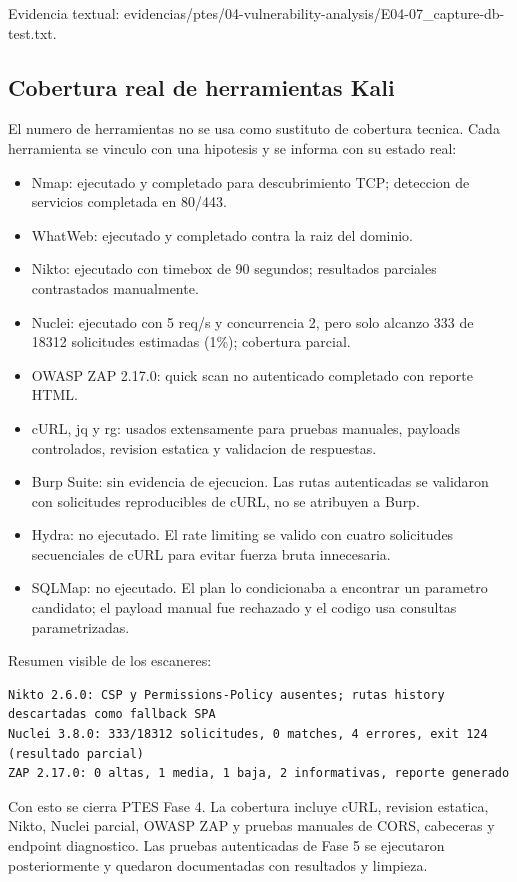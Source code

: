 Evidencia textual: evidencias/ptes/04-vulnerability-analysis/E04-07\_capture-db-test.txt.

\subsection{Cobertura real de herramientas Kali}\label{cobertura-real-de-herramientas-kali}

El numero de herramientas no se usa como sustituto de cobertura tecnica. Cada herramienta se vinculo con una hipotesis y se informa con su estado real:

\begin{itemize}
\tightlist
\item
  Nmap: ejecutado y completado para descubrimiento TCP; deteccion de servicios completada en 80/443.
\item
  WhatWeb: ejecutado y completado contra la raiz del dominio.
\item
  Nikto: ejecutado con timebox de 90 segundos; resultados parciales contrastados manualmente.
\item
  Nuclei: ejecutado con 5 req/s y concurrencia 2, pero solo alcanzo 333 de 18312 solicitudes estimadas (1\%); cobertura parcial.
\item
  OWASP ZAP 2.17.0: quick scan no autenticado completado con reporte HTML.
\item
  cURL, jq y rg: usados extensamente para pruebas manuales, payloads controlados, revision estatica y validacion de respuestas.
\item
  Burp Suite: sin evidencia de ejecucion. Las rutas autenticadas se validaron con solicitudes reproducibles de cURL, no se atribuyen a Burp.
\item
  Hydra: no ejecutado. El rate limiting se valido con cuatro solicitudes secuenciales de cURL para evitar fuerza bruta innecesaria.
\item
  SQLMap: no ejecutado. El plan lo condicionaba a encontrar un parametro candidato; el payload manual fue rechazado y el codigo usa consultas parametrizadas.
\end{itemize}

Resumen visible de los escaneres:

\begin{tcolorbox}[codebox]
\begin{Verbatim}[fontsize=\scriptsize,breaklines=true,breakanywhere=true]
Nikto 2.6.0: CSP y Permissions-Policy ausentes; rutas history descartadas como fallback SPA
Nuclei 3.8.0: 333/18312 solicitudes, 0 matches, 4 errores, exit 124 (resultado parcial)
ZAP 2.17.0: 0 altas, 1 media, 1 baja, 2 informativas, reporte generado
\end{Verbatim}
\end{tcolorbox}

Con esto se cierra PTES Fase 4. La cobertura incluye cURL, revision estatica, Nikto, Nuclei parcial, OWASP ZAP y pruebas manuales de CORS, cabeceras y endpoint diagnostico. Las pruebas autenticadas de Fase 5 se ejecutaron posteriormente y quedaron documentadas con resultados y limpieza.
